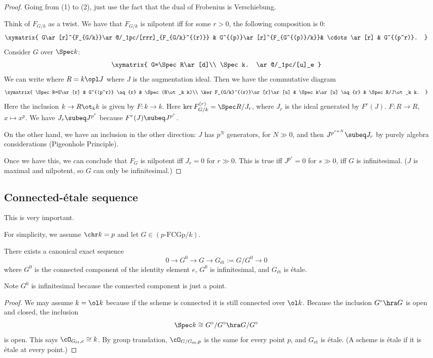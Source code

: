 \begin{proof}
Going from (1) to (2), just use the fact that the dual of Frobenius is Verschiebung.

Think of $F_{G/k}$ as a twist. We have that $F_{G/k}$ is nilpotent iff for some $r>0$, the following composition is 0:
\[
\xymatrix{
G\ar[r]^{F_{G/k}}\ar@/_1pc/[rrr]_{F_{G/k}^{(r)}} & G^{(p)}\ar[r]^{F_{G^{(p)}/k}}& \cdots \ar[r] & G^{(p^r)}.
}
\]
Consider $G$ over $\Spec k$:
\[
\xymatrix{
G=\Spec R\ar[d]\\
\Spec k. \ar@/_1pc/[u]_e
}
\]
We can write where $R=k\opl J$ where $J$ is the augmentation ideal. Then we have the commutative diagram
\[
\xymatrix{
\Spec R=G\ar[r] & G^{(p^r)} \aq{r} & \Spec(R\ot_k k)\\
\ker F_{G/k}^{(r)}\ar[r]\ar[u] & \Spec k\ar[u] \aq{r} & \Spec R/J\ot_k k.
}
\]
Here the inclusion $k\to R\ot_k k$ is given by $F:k\to k$. Here $\ker F_{G/k}^{(r)}=\Spec R/J_r$, where $J_r$ is the ideal generated by $F^r(J)$. $F:R\to R$, $x\mapsto x^p$. We have $J_r\subeq J^{p^r}$ because $F^r(J)\subeq J^{p^r}$.

On the other hand, we have an inclusion in the other direction: $J$ has $p^N$ generators, for $N\gg 0$, and then $J^{p^{r+N}}\subeq J_r$ by purely algebra considerations (Pigeonhole Principle).

Once we have this, we can conclude that $F_G$ is nilpotent iff $J_r=0$ for $r\gg 0$. This is true iff $J^{p^s}=0$ for $s\gg 0$, iff $G$ is infinitesimal. ($J$ is maximal and nilpotent, so $G$ can only be infinitesimal.) 
\end{proof}
\subsection{Connected-\'etale sequence}
This is very important.

For simplicity, we assume $\chr k=p$ and let $G\in (p\text{-FCGp}/k)$.
\begin{pr}
There exists a canonical exact sequence
\[
0\to G^0 \to G\to G_{\text{\'et}}:=G/G^0\to 0
\]
where $G^0$ is the connected component of the identity element $e$, $G^0$ is infinitesimal, and $G_{\text{\'et}}$ is \'etale.
\end{pr}
Note $G^0$ is infinitesimal because %
the connected component is just a point. %
\begin{proof}
We may assume $k=\ol k$ because if the scheme is connected it is still connected over $\ol k$. Because the inclusion $G^{\circ}\hra G$ is open and closed, the inclusion 
\[
\Spec k\cong G^{\circ}/G^{\circ}\hra G/G^{\circ}
\]
is open. This says $\cO_{G_{\text{\'et}},e}\cong k$. %
By group translation, $\cO_{G/G_{\text{\'et}},p}$ is the same for every point $p$, and $G_{\text{et}}$ is \'etale. (A scheme is \'etale if it is \'etale at every point.) %
\end{proof}
